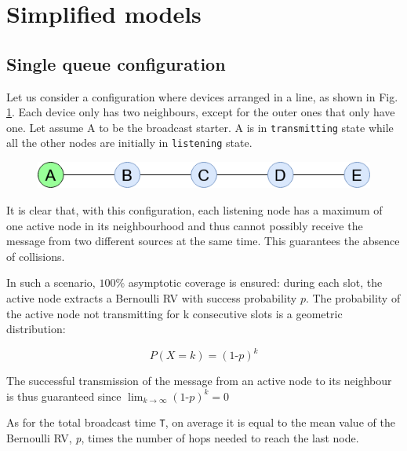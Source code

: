\section{Simplified models}

\subsection{Single queue configuration}\label{ssec:singlequeue}

Let us consider a configuration where devices arranged in a line, as shown in Fig. \ref{fig:single_queue}. Each device only has two neighbours, except for the outer ones that only have one. Let assume A to be the broadcast starter. A is in \texttt{transmitting} state while all the other nodes are initially in \texttt{listening} state. 
\hfill \break
\hfill \break

\begin{figure}[H]%
    \centering
	{{\includegraphics[scale=0.6]{img/single_queue.png} }}%
    \caption{}%
    \label{fig:single_queue}%
\end{figure}

It is clear that, with this configuration, each listening node has a maximum of one active node in its neighbourhood and thus cannot possibly receive the message from two different sources at the same time.
This guarantees the absence of collisions.

In such a scenario, $100\%$ asymptotic coverage is ensured:
during each slot, the active node extracts a Bernoulli RV with success probability $p$. The probability of the active node not transmitting for k consecutive slots is a geometric distribution:

\begin{equation}
	P(X = k) = (1\text{-}p)^{k}
	\label{geometric_distribution}
\end{equation}

The successful transmission of the message from an active node to its neighbour is thus guaranteed since $\lim_{k \to \infty} (1\text{-}p)^{k} = 0$

As for the total broadcast time \texttt{T}, on average it is equal to the mean value of the Bernoulli RV, \textit{p}, times the number of hops needed to reach the last node.

